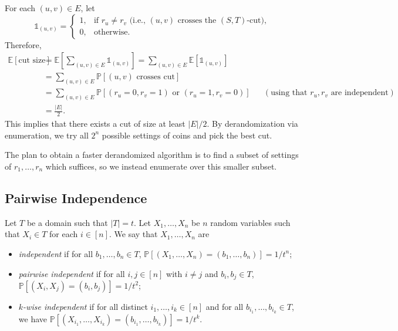 \documentclass[letterpaper, reqno,11pt]{article}
\newcommand{\PP}{\mathbb{P}}
\newcommand{\EE}{\mathbb{E}}
\begin{document}
For each $(u, v) \in E$, let
$$ \mathds 1_{(u, v)} = \left\{
  \begin{array}{ll}
    1, & \text{if $r_u \neq r_v$ (i.e., $(u, v)$ crosses the $(S, T)$-cut)}, \\
    0, & \text{otherwise}.
  \end{array}
\right. $$
Therefore,
\begin{align*}
  \EE[\text{cut size}] &= \EE\left[\sum_{(u, v) \in E} \mathds 1_{(u, v)}\right] = \sum_{(u, v) \in E} \EE\left[\mathds 1_{(u, v)}\right] \\
  &= \sum_{(u, v) \in E} \PP[\text{$(u, v)$ crosses cut}] \\
  &= \sum_{(u, v) \in E} \PP\left[(r_u = 0, r_v = 1) \text{ or } (r_u = 1, r_v = 0)\right] && (\text{using that $r_u, r_v$ are independent}) \\
  &= \frac{|E|}{2}.
\end{align*}
This implies that there exists a cut of size at least $|E|/2$. By derandomization via enumeration, we try all $2^n$ possible settings of coins and pick the best cut.

The plan to obtain a faster derandomized algorithm is to find a subset of settings of $r_1, \ldots, r_n$ which suffices, so we instead enumerate over this smaller subset.

\subsection{Pairwise Independence}

\begin{definition}
  Let $T$ be a domain such that $|T| = t$. Let $X_1, \ldots, X_n$ be $n$ random variables such that $X_i \in T$ for each $i \in [n]$. We say that $X_1, \ldots, X_n$ are
  \begin{itemize}[itemsep=0pt]
    \item \emph{independent} if for all $b_1, \ldots, b_n \in T$, $\PP[(X_1, \ldots, X_n) = (b_1, \ldots, b_n)] = 1/t^n$;
    \item \emph{pairwise independent} if for all $i, j \in [n]$ with $i \neq j$ and $b_i, b_j \in T$, $\PP[(X_i, X_j) = (b_i, b_j)] = 1/t^2$;
    \item \emph{$k$-wise independent} if for all distinct $i_1, \ldots, i_k \in [n]$ and for all $b_{i_1}, \ldots, b_{i_k} \in T$, we have $\PP[(X_{i_1}, \ldots, X_{i_k}) = (b_{i_1}, \ldots, b_{i_k})] = 1/t^k$.
  \end{itemize}
\end{definition}
\end{document}
